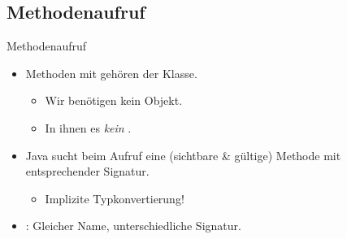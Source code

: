 {\subsection{Methodenaufruf}
\begin{frame}[c]{Methodenaufruf}
   \begin{itemize}[<+(1)->]
      \itemsep11pt
      \item Methoden mit  gehören der Klasse. \begin{itemize}
         \item Wir benötigen kein Objekt.
         \item In ihnen  es \textit{kein} .
      \end{itemize}
      \item Java sucht beim Aufruf eine (sichtbare \& gültige) Methode mit entsprechender Signatur. \begin{itemize}
         \item Implizite Typkonvertierung!
      \end{itemize}
      \item {}: Gleicher Name, unterschiedliche Signatur.
   \end{itemize}
\end{frame}

}
